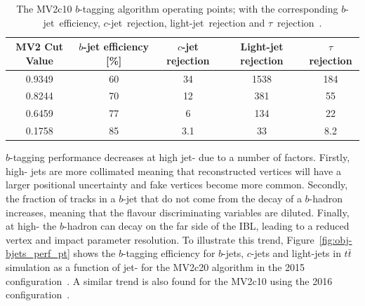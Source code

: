 \begin{table}[!htb]
  \begin{center}
    \begin{tabular}{|c||c|c|c|c|}
      \hline
      MV2 Cut Value  &  $b$-jet efficiency [\%]  &     $c$-jet rejection   &   Light-jet rejection  &    $\tau$ rejection  \\
      \hline
      0.9349         &           60              &           34          &      1538              &     184              \\
      0.8244         &           70              &           12          &       381              &      55              \\
      0.6459         &           77              &           6           &       134              &      22              \\
      0.1758         &           85              &           3.1         &        33              &     8.2              \\
      \hline
    \end{tabular}
    \caption[The MV2c10 $b$-tagging algorithm operating points; with the corresponding $b$-jet~efficiency, $c$-jet~rejection, light-jet~rejection and $\tau$~rejection.]
            {The MV2c10 $b$-tagging algorithm operating points; with the corresponding $b$-jet~efficiency, $c$-jet~rejection, light-jet~rejection and $\tau$~rejection~\cite{obj-bjets_algo_2016}.}
            \label{tab:obj-MV2_WPs}
  \end{center}
  \vspace{-2em}
\end{table}

$b$-tagging performance decreases at high jet-\pT{} due to a number of factors.
Firstly, high-\pT{} jets are more collimated meaning that reconstructed vertices
will have a larger positional uncertainty and fake vertices become more common.
Secondly, the fraction of tracks in a $b$-jet that do not come from the decay of a $b$-hadron increases,
meaning that the flavour discriminating variables are diluted.
Finally, at high-\pT{} the $b$-hadron can decay on the far side of the IBL, leading to a reduced vertex and impact parameter resolution.
To illustrate this trend, Figure~\ref{fig:obj-bjets_perf_pt} shows the $b$-tagging efficiency for $b$-jets, $c$-jets and light-jets in $t\bar{t}$ simulation as a function of jet-\pT{}
for the MV2c20 algorithm in the 2015 configuration~\cite{obj-bjets_algo_2015}. A similar trend is also found for the MV2c10 using the 2016 configuration~\cite{obj-bjets_algo_2016}.

